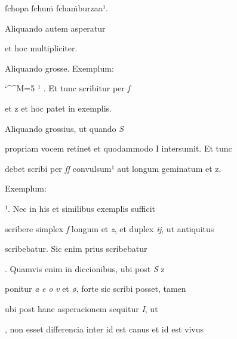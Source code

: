 ſchopa ſchuṁ ſchaṁburzaa¹.

\indentK Aliquando autem asperatur

\splitlines

et hoc multipliciter.

\indentK Aliquando grosse. Exemplum:  

\fulllines

\catcode `\^^M=5
\obeylines
{}  ¹ . Et tunc scribitur per \textit{ſ} 

\splitlines

 et z et hoc patet in exemplis.

Aliquando grossius, ut quando \textit{S}

\fulllines

propriam vocem retinet et quodammodo I intersumit. Et tunc 

debet scribi per \textit{ſſ} convulsum¹ aut longum geminatum et z. 


Exemplum:      

 ¹. Nec in his et similibus exemplis sufficit 


scribere simplex \textit{ſ} longum et \textit{z}, et duplex \textit{ĳ}, ut antiquitus 

scribebatur. Sic enim prius scribebatur  

. Quamvis enim in diccionibus, ubi post \textit{S} z 


ponitur \textit{a} \textit{e} \textit{o} \textit{v} et \textit{ø}, forte sic scribi posset, tamen 

ubi post hanc asperacionem sequitur \textit{I}, ut  

, non esset differencia inter  id est canus et  id est vivus 

